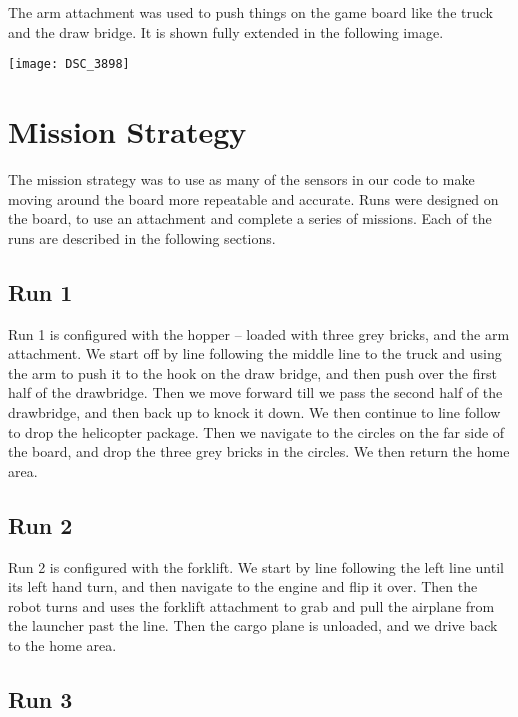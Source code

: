 \documentclass[letter, article]{article}
\begin{document}
The arm attachment was used to push things on the game board like the truck and the draw bridge.  It is shown fully extended in the following image.

\begin{center}
\texttt{[image: DSC\_3898]}
\end{center}

\section{Mission Strategy}

The mission strategy was to use as many of the sensors in our code to make moving around the board more repeatable and accurate.  Runs were designed on the board, to use an attachment and complete a series of missions.  Each of the runs are described in the following sections.

\subsection{Run 1}

Run 1 is configured with the hopper -- loaded with three grey bricks, and the arm attachment.  We start off by line following the middle line to the truck and using the arm to push it to the hook on the draw bridge, and then push over the first half of the drawbridge.  Then we move forward till we pass the second half of the drawbridge, and then back up to knock it down.  We then continue to line follow to drop the helicopter package.  Then we navigate to the circles on the far side of the board, and drop the three grey bricks in the circles.  We then return the home area.

\subsection{Run 2}

Run 2 is configured with the forklift.  We start by line following the left line until its left hand turn, and then navigate to the engine and flip it over.  Then the robot turns and uses the forklift attachment to grab and pull the airplane from the launcher past the line.  Then the cargo plane is unloaded, and we drive back to the home area.

\subsection{Run 3}
\end{document}
